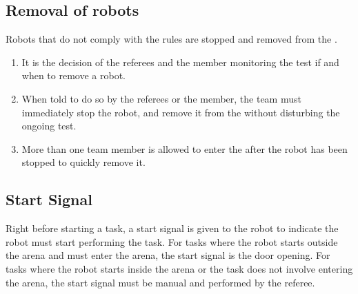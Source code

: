 \subsection{Removal of robots}\label{rule:robot_removal}

Robots that do not comply with the rules are stopped and removed from the \Arena{}.

\begin{enumerate}
	\item It is the decision of the referees and the \TC{} member monitoring the test if and when to remove a robot.

	\item When told to do so by the referees or the \TC{} member, the team must immediately stop the robot, and remove it from the \Arena{} without disturbing the ongoing test.
	
	\item More than one team member is allowed to enter the \Arena{} after the robot has been stopped to quickly remove it.

\end{enumerate}


\subsection{Start Signal}\label{rule:start_signal}
Right before starting a task, a start signal is given to the robot to indicate the robot must start performing the task.
For tasks where the robot starts outside the arena and must enter the arena, the start signal is the door opening. 
For tasks where the robot starts inside the arena or the task does not involve entering the arena, the start signal must be manual and performed by the referee. 

